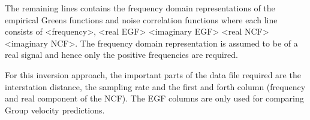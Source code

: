 \documentclass{article}
\begin{document}
The remaining lines contains the frequency domain representations of
the empirical Greens functions and noise correlation functions where
each line consists of <frequency>, <real EGF> <imaginary EGF> <real
NCF> <imaginary NCF>. The frequency domain representation is assumed
to be of a real signal and hence only the positive frequencies are
required.

For this inversion approach, the important parts of the data file
required are the interstation distance, the sampling rate and the
first and forth column (frequency and real component of the NCF). The
EGF columns are only used for comparing Group velocity predictions.
\end{document}
